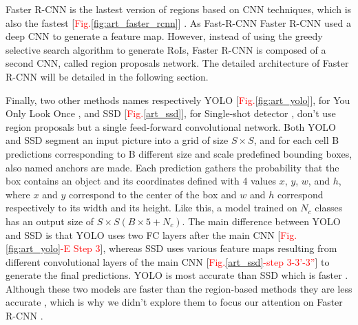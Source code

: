 \documentclass[12pt, french, a4paper]{article} %
\begin{document}
\par Faster \gls{R-CNN} is the lastest version of regions based on CNN techniques, which is also the fastest [\textcolor{red}{Fig.}\ref{fig:art_faster_rcnn}] \cite{ren2015faster}. As Fast-\gls{R-CNN} Faster \gls{R-CNN} used a deep \gls{CNN} to generate a feature map. However, instead of using the greedy selective search algorithm to generate RoIs, Faster \gls{R-CNN} is composed of a second CNN, called region proposals network. The detailed architecture of Faster \gls{R-CNN} will be detailed in the following section.
\par Finally, two other methods names respectively \gls{YOLO} [\textcolor{red}{Fig.}\ref{fig:art_yolo}], for You Only Look Once \cite{redmon2016you}, and \gls{SSD} [\textcolor{red}{Fig.}\ref{art_ssd}], for Single-shot detector \cite{liu2016SSD}, don't use region proposals but a single feed-forward convolutional network. Both \gls{YOLO} and \gls{SSD} segment an input picture into a grid of size $S\times S$, and for each cell B predictions corresponding to B different size and scale predefined bounding boxes, also named anchors are made. Each prediction gathers the probability that the box contains an object and its coordinates defined with 4 values $x$, $y$, $w$, and $h$, where $x$ and $y$ correspond to the center of the box and $w$ and $h$ correspond respectively to its width and its height. Like this, a model trained on $N_c$ classes has an output size of $S\times S(B\times 5 + N_c)$. The main difference between \gls{YOLO} and \gls{SSD} is that \gls{YOLO} uses two \gls{FC} layers after the main CNN [\textcolor{red}{Fig.}\ref{fig:art_yolo}\textcolor{red}{-E Step 3}], whereas \gls{SSD} uses various feature maps resulting from different convolutional layers of the main CNN [\textcolor{red}{Fig.}\ref{art_ssd}\textcolor{red}{-step 3-3'-3''}] to generate the final predictions. \gls{YOLO} is most accurate than \gls{SSD} which is faster \cite{huang2017speed}. Although these two models are faster than the region-based methods they are less accurate \cite{huang2017speed}, which is why we didn't explore them to focus our attention on Faster \gls{R-CNN} \cite{ren2015faster}.



\end{document}
